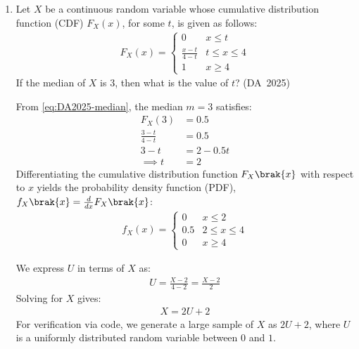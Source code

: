 \begin{enumerate}[label=\thesubsection.\arabic*, ref=\thesubsection.\theenumi]
	

	
\item 
Let $X$ be a continuous random variable whose cumulative distribution function (CDF) $F_X(x)$, for some $t$, is given as follows:
\begin{align}
	F_X(x) = \begin{cases}
		0 & x \le t \\
		\frac{x - t}{4 - t} & t \le x \le 4 \\
		1 & x \ge 4
	\end{cases}
	\label{eq:DA-2025-19-1}
\end{align}
If the median of $X$ is 3, then what is the value of $t$?
\hfill (DA~2025)
\begin{enumerate}
	\begin{multicols}{4}
		\item $2$
		\item $1$
		\item $-1$
		\item $0$
	\end{multicols}
\end{enumerate}
\solution
From \eqref{eq:DA2025-median}, the median $m = 3$ satisfies:
\begin{align}
	F_X(3) &= 0.5
	\\
	\frac{3 - t}{4 - t} &= 0.5
	\\
	3 - t &= 2 - 0.5t
	\\
	\implies t &= 2
\end{align}
Differentiating the cumulative distribution function $F_X\brak{x}$ with respect to $x$ yields the probability density function (PDF), $f_X\brak{x} = \frac{d}{dx}F_X\brak{x}$:
\begin{align}
	f_X(x) = \begin{cases}
		0 & x \le 2 \\
		0.5 & 2 \le x \le 4 \\
		0 & x \ge 4
	\end{cases}
\end{align}

We express $U$ in terms of $X$ as:
\begin{align}
	U = \frac{X - 2}{4 - 2} = \frac{X - 2}{2}
\end{align}
Solving for $X$ gives:
\begin{align}
	X = 2U + 2
\end{align}
For verification via code, we generate a large sample of $X$ as $2U + 2$, where $U$ is a uniformly distributed random variable between $0$ and $1$.
\\


\end{enumerate}
